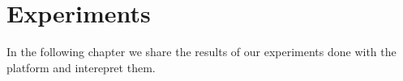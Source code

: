 \documentclass[class=article, crop=false]{standalone}
\begin{document}
\chapter{Experiments}\label{cha:exp}

In the following chapter we share the results of our experiments done with the platform and interepret them.




\end{document}
